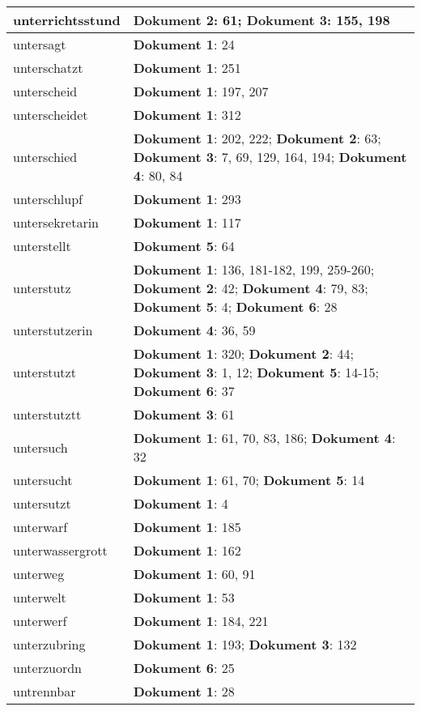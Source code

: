 \documentclass[a5paper]{article}
\begin{document}
\begin{longtable}[l]{|l|p{3in}|}
\hline
unterrichtsstund & \textbf{Dokument 2}: 61; \textbf{Dokument 3}: 155, 198 \\
\hline
untersagt & \textbf{Dokument 1}: 24 \\
\hline
unterschatzt & \textbf{Dokument 1}: 251 \\
\hline
unterscheid & \textbf{Dokument 1}: 197, 207 \\
\hline
unterscheidet & \textbf{Dokument 1}: 312 \\
\hline
unterschied & \textbf{Dokument 1}: 202, 222; \textbf{Dokument 2}: 63; \textbf{Dokument 3}: 7, 69, 129, 164, 194; \textbf{Dokument 4}: 80, 84 \\
\hline
unterschlupf & \textbf{Dokument 1}: 293 \\
\hline
untersekretarin & \textbf{Dokument 1}: 117 \\
\hline
unterstellt & \textbf{Dokument 5}: 64 \\
\hline
unterstutz & \textbf{Dokument 1}: 136, 181-182, 199, 259-260; \textbf{Dokument 2}: 42; \textbf{Dokument 4}: 79, 83; \textbf{Dokument 5}: 4; \textbf{Dokument 6}: 28 \\
\hline
unterstutzerin & \textbf{Dokument 4}: 36, 59 \\
\hline
unterstutzt & \textbf{Dokument 1}: 320; \textbf{Dokument 2}: 44; \textbf{Dokument 3}: 1, 12; \textbf{Dokument 5}: 14-15; \textbf{Dokument 6}: 37 \\
\hline
unterstutztt & \textbf{Dokument 3}: 61 \\
\hline
untersuch & \textbf{Dokument 1}: 61, 70, 83, 186; \textbf{Dokument 4}: 32 \\
\hline
untersucht & \textbf{Dokument 1}: 61, 70; \textbf{Dokument 5}: 14 \\
\hline
untersutzt & \textbf{Dokument 1}: 4 \\
\hline
unterwarf & \textbf{Dokument 1}: 185 \\
\hline
unterwassergrott & \textbf{Dokument 1}: 162 \\
\hline
unterweg & \textbf{Dokument 1}: 60, 91 \\
\hline
unterwelt & \textbf{Dokument 1}: 53 \\
\hline
unterwerf & \textbf{Dokument 1}: 184, 221 \\
\hline
unterzubring & \textbf{Dokument 1}: 193; \textbf{Dokument 3}: 132 \\
\hline
unterzuordn & \textbf{Dokument 6}: 25 \\
\hline
untrennbar & \textbf{Dokument 1}: 28 \\

\end{longtable}
\end{document}

